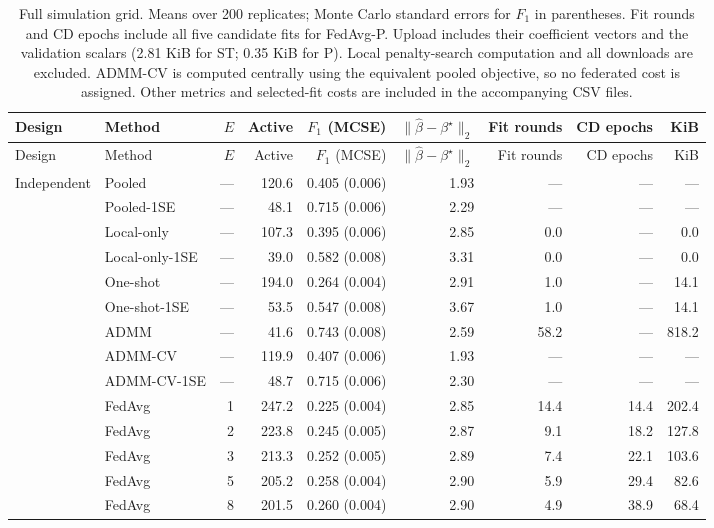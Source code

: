 \begingroup\footnotesize\setlength{\tabcolsep}{4pt}
\begin{longtable}{llrrrrrrr}
\caption{Full simulation grid. Means over 200 replicates; Monte Carlo standard errors for $F_1$ in parentheses. Fit rounds and CD epochs include all five candidate fits for FedAvg-P. Upload includes their coefficient vectors and the validation scalars (2.81 KiB for ST; 0.35 KiB for P). Local penalty-search computation and all downloads are excluded. ADMM-CV is computed centrally using the equivalent pooled objective, so no federated cost is assigned. Other metrics and selected-fit costs are included in the accompanying CSV files.}\label{tab:full}\\
\toprule
Design & Method & $E$ & Active & $F_1$ (MCSE) & $\|\hat\beta-\beta^\star\|_2$ & Fit rounds & CD epochs & KiB \\
\midrule
\endfirsthead
\toprule
Design & Method & $E$ & Active & $F_1$ (MCSE) & $\|\hat\beta-\beta^\star\|_2$ & Fit rounds & CD epochs & KiB \\
\midrule
\endhead
\bottomrule
\endfoot
Independent & Pooled & --- & 120.6 & 0.405 (0.006) & 1.93 & --- & --- & --- \\
 & Pooled-1SE & --- & 48.1 & 0.715 (0.006) & 2.29 & --- & --- & --- \\
 & Local-only & --- & 107.3 & 0.395 (0.006) & 2.85 & 0.0 & --- & 0.0 \\
 & Local-only-1SE & --- & 39.0 & 0.582 (0.008) & 3.31 & 0.0 & --- & 0.0 \\
 & One-shot & --- & 194.0 & 0.264 (0.004) & 2.91 & 1.0 & --- & 14.1 \\
 & One-shot-1SE & --- & 53.5 & 0.547 (0.008) & 3.67 & 1.0 & --- & 14.1 \\
 & ADMM & --- & 41.6 & 0.743 (0.008) & 2.59 & 58.2 & --- & 818.2 \\
 & ADMM-CV & --- & 119.9 & 0.407 (0.006) & 1.93 & --- & --- & --- \\
 & ADMM-CV-1SE & --- & 48.7 & 0.715 (0.006) & 2.30 & --- & --- & --- \\
 & FedAvg & 1 & 247.2 & 0.225 (0.004) & 2.85 & 14.4 & 14.4 & 202.4 \\
 & FedAvg & 2 & 223.8 & 0.245 (0.005) & 2.87 & 9.1 & 18.2 & 127.8 \\
 & FedAvg & 3 & 213.3 & 0.252 (0.005) & 2.89 & 7.4 & 22.1 & 103.6 \\
 & FedAvg & 5 & 205.2 & 0.258 (0.004) & 2.90 & 5.9 & 29.4 & 82.6 \\
 & FedAvg & 8 & 201.5 & 0.260 (0.004) & 2.90 & 4.9 & 38.9 & 68.4 \\

\end{longtable}

